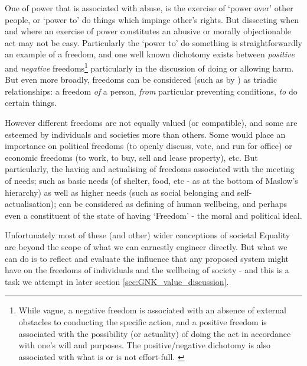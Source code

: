 One \DIFdelbegin {}\DIFdelend \DIFaddbegin {}\DIFaddend of power that is associated with abuse, is the exercise of `power over' other people, or `power to' do things which impinge \DIFdelbegin {}\DIFdelend \DIFaddbegin {}\DIFaddend other's rights.
But dissecting when and where an exercise of power constitutes an abusive or morally objectionable act may not be easy.
Particularly the `power to' do something is straightforwardly an example of a freedom, and one well known dichotomy exists between \textit{positive} and \textit{negative} freedoms\footnote{While vague, a negative freedom is associated with an absence of external obstacles to conducting the specific action, and a positive freedom is associated with the possibility (or actuality) of doing the act in accordance with one's will and purposes. The positive/negative dichotomy is also associated with what is or is not effort-full. \citep{Mossel2009-MOSNA}} particularly in the discussion of doing or allowing harm.
But even more broadly, freedoms can be considered (such as by \cite{Negative_and_Positive_Freedom}) as triadic relationships: a freedom \textit{of} a person, \textit{from} particular preventing conditions, \textit{to} do certain things.

However different freedoms are not equally valued (or compatible), and some are esteemed by individuals and societies more than others.
Some would place an importance on political freedoms (to openly discuss, vote, and run for office) or economic freedoms (to work, to buy, sell and lease property), etc. %
But particularly, the having and actualising of freedoms associated with the meeting of needs; such as basic needs (of shelter, food, etc - as at the bottom of Maslow's hierarchy) as well as higher needs (such as social belonging and self-actualisation); can be considered as defining of human wellbeing, and perhaps even a constituent of the state of having `Freedom' - the moral and political ideal.

Unfortunately most of these (and other) wider conceptions of societal Equality are beyond the scope of what we can earnestly engineer directly. But what we can do is to reflect and evaluate the influence that any proposed system might have on the freedoms of individuals and the wellbeing of society - and this is a task we attempt in later section \ref{sec:GNK_value_discussion}.

